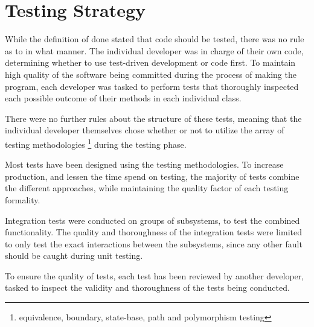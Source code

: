 \chapter{Testing Strategy}
	
	While the definition of done stated that code should be tested, there was no rule as to in what manner. The individual developer was in charge of their own code, determining whether to use test-driven development or code first.
	To maintain high quality of the software being committed during the process of making the program, each developer was tasked to perform tests that thoroughly inspected each possible outcome of their methods in each individual class.
	
	There were no further rules about the structure of these tests, meaning that the individual developer themselves chose whether or not to utilize the array of testing methodologies \footnote{equivalence, boundary, state-base, path and polymorphism testing} during the testing phase.
	
	Most tests have been designed using the testing methodologies. To increase production, and lessen the time spend on testing, the majority of tests combine the different approaches, while maintaining the quality factor of each testing formality.

	Integration tests were conducted on groups of subsystems, to test the combined functionality. The quality and thoroughness of the integration tests were limited to only test the exact interactions between the subsystems, since any other fault should be caught during unit testing.
	
	To ensure the quality of tests, each test has been reviewed by another developer, tasked to inspect the validity and thoroughness of the tests being conducted.